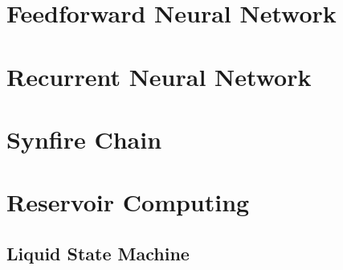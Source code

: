 \section{Feedforward Neural Network}
\section{Recurrent Neural Network}
\section{Synfire Chain}
\section{Reservoir Computing}
\subsection{Liquid State Machine}

